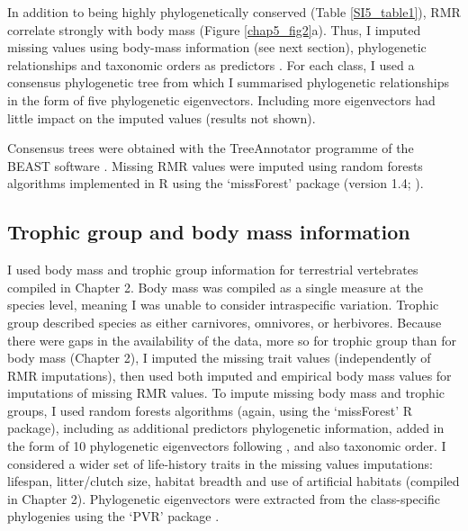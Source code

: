 In addition to being highly phylogenetically conserved (Table \ref{SI5_table1}), RMR correlate strongly with body mass (Figure \ref{chap5_fig2}a). Thus, I imputed missing values using body-mass information (see next section), phylogenetic relationships and taxonomic orders as predictors \citep{Penone2014}. For each class, I used a consensus phylogenetic tree from which I summarised phylogenetic relationships in the form of five phylogenetic eigenvectors. Including more eigenvectors had little impact on the imputed values (results not shown). 

Consensus trees were obtained with the TreeAnnotator programme of the BEAST software \citep{Bouckaert2014}. Missing RMR values were imputed using random forests algorithms implemented in R using the `missForest' package (version 1.4; \citet{Stekhoven2012, Stekhoven2016}).  

\subsection{Trophic group and body mass information}

I used body mass and trophic group information for terrestrial vertebrates compiled in Chapter 2. Body mass was compiled as a single measure at the species level, meaning I was unable to consider intraspecific variation. Trophic group described species as either carnivores, omnivores, or herbivores. Because there were gaps in the availability of the data, more so for trophic group than for body mass (Chapter 2), I imputed the missing trait values (independently of RMR imputations), then used both imputed and empirical body mass values for imputations of missing RMR values. To impute missing body mass and trophic groups, I used random forests algorithms (again, using the `missForest' R package), including as additional predictors phylogenetic information, added in the form of 10 phylogenetic eigenvectors \citep{DinizFilho2012} following \citet{Penone2014}, and also taxonomic order. I considered a wider set of life-history traits in the missing values imputations: lifespan, litter/clutch size, habitat breadth and use of artificial habitats (compiled in Chapter 2). Phylogenetic eigenvectors were extracted from the class-specific phylogenies using the `PVR' package \citep{Santos2018}.  

